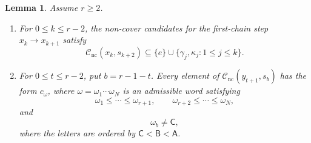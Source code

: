 \documentclass[11pt,a4paper,reqno]{amsart}
\numberwithin{equation}{section}
\newtheorem{lemma}[theorem]{Lemma}
\theoremstyle{definition}
\theoremstyle{remark}
\theoremstyle{plain}
\newcommand{\A}{\mathsf A}
\newcommand{\B}{\mathsf B}
\newcommand{\CC}{\mathsf C}
\begin{document}
\begin{lemma}\label{lem:candidates}
Assume $r\geq2$.
\begin{enumerate}[label=\textup{(\roman*)}]
\item For $0\leq k\leq r-2$, the non-cover candidates for the
first-chain step $x_k\to x_{k+1}$ satisfy
\[
 \mathcal C_{\mathrm{nc}}(x_k,s_{k+2})
 \subseteq \{e\}\cup\{\gamma_j,\kappa_j:1\leq j\leq k\}.
\]
\item For $0\leq t\leq r-2$, put $b=r-1-t$.
Every element of $\mathcal C_{\mathrm{nc}}(y_{t+1},s_b)$
has the form $c_\omega$, where $\omega=\omega_1\cdots\omega_N$
is an admissible word satisfying
\begin{equation}\label{eq:outer-block-order}
 \omega_1\leq\cdots\leq\omega_{r+1},\qquad
 \omega_{r+2}\leq\cdots\leq\omega_N,
\end{equation}
and
\begin{equation}\label{eq:outer-prefix-letter}
 \omega_b\ne\CC,
\end{equation}
where the letters are ordered by $\CC<\B<\A$.
\end{enumerate}
\end{lemma}
\end{document}
